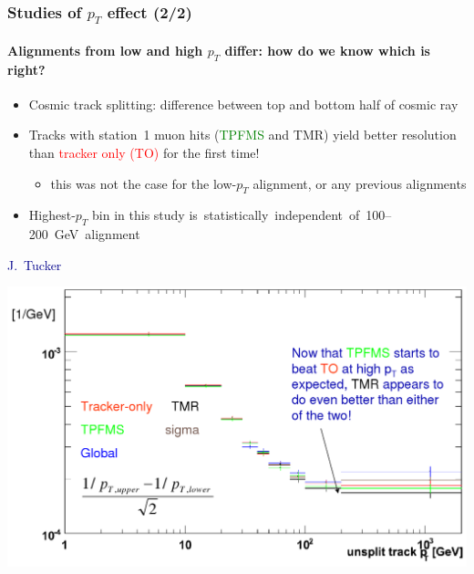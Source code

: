 \documentclass[compress]{beamer}
\begin{document}
\begin{frame}
\frametitle{Studies of $p_T$ effect (2/2)}
\framesubtitle{Alignments from low and high $p_T$ differ: how do we know which is right?}
\scriptsize

\begin{itemize}
\item Cosmic track splitting: difference between top and bottom half of cosmic ray
\item Tracks with station~1 muon hits (\textcolor{green}{TPFMS} and TMR) yield better resolution than \textcolor{red}{tracker only (TO)} for the first time!
\begin{itemize}\scriptsize
\item this was not the case for the low-$p_T$ alignment, or any previous alignments
\end{itemize}
\item Highest-$p_T$ bin in this study \mbox{is statistically independent of 100--200~GeV alignment\hspace{-1 cm}}
\end{itemize}

\hfill \scriptsize \textcolor{darkblue}{J.~Tucker}

\vspace{-\baselineskip}
\includegraphics[width=0.87\linewidth]{cosmicsplitting_jordan.png}
\end{frame}
\end{document}
